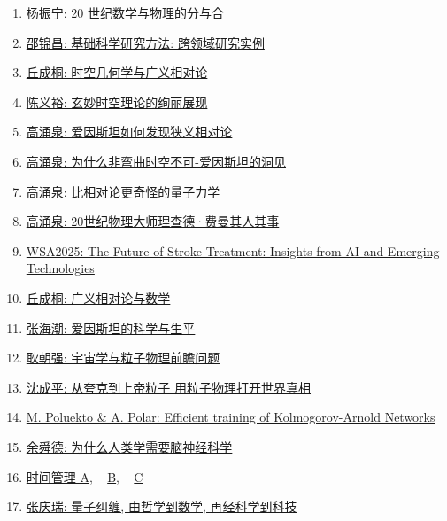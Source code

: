 \documentclass[11pt]{article}
\begin{document}
\begin{enumerate}
	\item \href{https://mp.weixin.qq.com/s/uVdW4G3vbp0NHbuQ-F3Csg}{杨振宁: 20 世纪数学与物理的分与合}	%
	\item \href{https://mp.weixin.qq.com/s/mn_XEd9a3maHXnJJDc2--Q}{邵锦昌: 基础科学研究方法: 跨领域研究实例}	%
	\item \href{https://mp.weixin.qq.com/s/4xGp2PjOZaxsXFPSJ9-iEQ}{丘成桐: 时空几何学与广义相对论}	%
	\item \href{https://mp.weixin.qq.com/s/YAAfDzpLc69hiOKjX0vVVQ}{陈义裕: 玄妙时空理论的绚丽展现}	%
	\item \href{https://mp.weixin.qq.com/s/2O0377rTEINq5jMCnm_PNw}{高涌泉: 爱因斯坦如何发现狭义相对论}	%
	\item \href{https://mp.weixin.qq.com/s/4nFEYIH51VraTI30JjQrhg}{高涌泉: 为什么非弯曲时空不可-爱因斯坦的洞见}	%
	\item \href{https://mp.weixin.qq.com/s/ETtGyYwkDtkQwZns4NMEzw}{高涌泉: 比相对论更奇怪的量子力学}	%
	\item \href{https://mp.weixin.qq.com/s/ZksWAeyMlvl5G52R8HNXaA}{高涌泉: 20世纪物理大师理查德·费曼其人其事}	%
	\item \href{https://mp.weixin.qq.com/s/69TNSGhalcbiyZes2ItHNg}{WSA2025: The Future of Stroke Treatment: Insights from AI and Emerging Technologies}	%
	\item \href{https://mp.weixin.qq.com/s/nFFqyTDZg3VYadGgvXKNNA}{丘成桐: 广义相对论与数学}	%
	\item \href{https://mp.weixin.qq.com/s/3XLe4oFvgRdtNwqIxLGSaA}{张海潮: 爱因斯坦的科学与生平}	%
	\item \href{https://mp.weixin.qq.com/s/5OfUXxpPaf_clj0yRoxyTA}{耿朝强: 宇宙学与粒子物理前瞻问题}	%
	\item \href{https://mp.weixin.qq.com/s/hWlIRgg8AVSC-jTHJpN_Tg}{沈成平: 从夸克到上帝粒子 用粒子物理打开世界真相}	%
	\item \href{https://mp.weixin.qq.com/s/u9U_RwAC0Gv3wOdP9QVjow}{M. Poluekto \& A. Polar: Efficient training of Kolmogorov-Arnold Networks}	%
	\item \href{https://mp.weixin.qq.com/s/tMLB4FfYv9d9nb_bCFmSnA}{余舜德: 为什么人类学需要脑神经科学}	%
	\item \href{https://mp.weixin.qq.com/s/2ms4jYr4rdsH3zOW26TlDQ}{时间管理 A}, ~  \href{https://mp.weixin.qq.com/s/RCEL5QsWwj4csM_gzPI0Xw}{B}, ~  \href{https://mp.weixin.qq.com/s/d5XTugV4AYyQLfvU9mhJuA}{C}	%
	\item \href{https://mp.weixin.qq.com/s/tztr4DGH0Hz8Qw-4tjZNow}{张庆瑞: 量子纠缠, 由哲学到数学, 再经科学到科技}	%

\end{enumerate}
\end{document}
